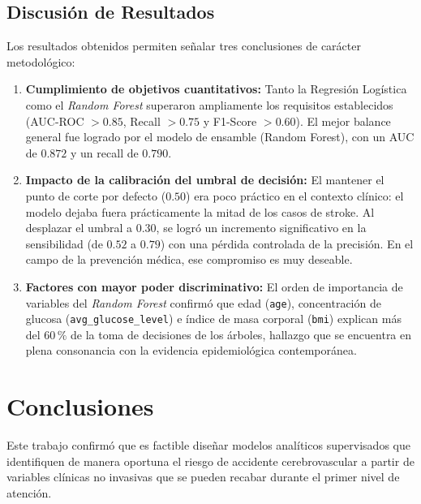 \documentclass[12pt,a4paper]{article}
\begin{document}
\subsection{Discusión de Resultados}
Los resultados obtenidos permiten señalar tres conclusiones de carácter metodológico:
\begin{enumerate}[itemsep=0.3em,leftmargin=1.2cm]
    \item \textbf{Cumplimiento de objetivos cuantitativos:} Tanto la Regresión Logística como el \textit{Random Forest} superaron ampliamente los requisitos establecidos (AUC-ROC $> 0.85$, Recall $> 0.75$ y F1-Score $> 0.60$). El mejor balance general fue logrado por el modelo de ensamble (Random Forest), con un AUC de $0.872$ y un recall de $0.790$.
    \item \textbf{Impacto de la calibración del umbral de decisión:} El mantener el punto de corte por defecto ($0.50$) era poco práctico en el contexto clínico: el modelo dejaba fuera prácticamente la mitad de los casos de stroke. Al desplazar el umbral a $0.30$, se logró un incremento significativo en la sensibilidad (de $0.52$ a $0.79$) con una pérdida controlada de la precisión. En el campo de la prevención médica, ese compromiso es muy deseable.
    \item \textbf{Factores con mayor poder discriminativo:} El orden de importancia de variables del \textit{Random Forest} confirmó que edad (\texttt{age}), concentración de glucosa (\texttt{avg\_glucose\_level}) e índice de masa corporal (\texttt{bmi}) explican más del $60\,\%$ de la toma de decisiones de los árboles, hallazgo que se encuentra en plena consonancia con la evidencia epidemiológica contemporánea.
\end{enumerate}

\section{Conclusiones}

Este trabajo confirmó que es factible diseñar modelos analíticos supervisados que identifiquen de manera oportuna el riesgo de accidente cerebrovascular a partir de variables clínicas no invasivas que se pueden recabar durante el primer nivel de atención.
\end{document}
